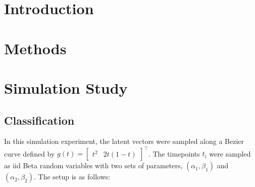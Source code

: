 \documentclass[
  11pt,
]{article}
\author{}
\date{\vspace{-2.5em}}
\begin{document}
\newcommand{\diag}{\mathrm{diag}}
\newcommand{\tr}{\mathrm{Tr}}
\newcommand{\blockdiag}{\mathrm{blockdiag}}
\newcommand{\indep}{\stackrel{\mathrm{ind}}{\sim}}
\newcommand{\iid}{\stackrel{\mathrm{iid}}{\sim}}
\newcommand{\Bernoulli}{\mathrm{Bernoulli}}
\newcommand{\Betadist}{\mathrm{Beta}}
\newcommand{\BG}{\mathrm{BernoulliGraph}}
\newcommand{\Uniform}{\mathrm{Uniform}}
\newcommand{\PABM}{\mathrm{PABM}}
\newcommand{\RDPG}{\mathrm{RDPG}}
\newcommand{\GRDPG}{\mathrm{GRDPG}}
\newcommand{\Multinomial}{\mathrm{Multinomial}}
\newcommand{\dd}{\mathrm{d}}
\newcommand{\as}{\stackrel{\mathrm{a.s.}}{\to}}
\newcommand{\ER}{\text{Erd\"{o}s-R\'{e}nyi}}
\newcommand{\SBM}{\mathrm{SBM}}
\newcommand{\DCBM}{\mathrm{DCBM}}
\newcommand{\rank}{\mathrm{rank}}
\newcommand{\MBM}{\mathrm{MBM}}
\newcommand{\Poisson}{\mathrm{Poisson}}

\hypertarget{introduction}{%
\section{Introduction}\label{introduction}}

\hypertarget{methods}{%
\section{Methods}\label{methods}}

\hypertarget{simulation-study}{%
\section{Simulation Study}\label{simulation-study}}

\hypertarget{classification}{%
\subsection{Classification}\label{classification}}

In this simulation experiment, the latent vectors were sampled along a
Bezier curve defined by
\(g(t) = \begin{bmatrix} t^2 & 2 t (1-t) \end{bmatrix}^\top\). The
timepoints \(t_i\) were sampled as iid Beta random variables with two
sets of parameters, \((\alpha_1, \beta_1)\) and \((\alpha_2, \beta_2)\).
The setup is as follows:
\end{document}
